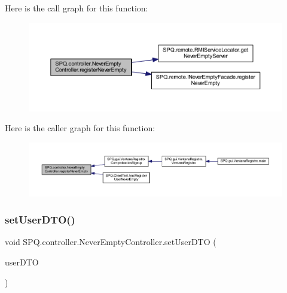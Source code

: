 Here is the call graph for this function\+:\nopagebreak
\begin{figure}[H]
\begin{center}
\leavevmode
\includegraphics[width=350pt]{class_s_p_q_1_1controller_1_1_never_empty_controller_ad02b010ba25f24bf105fe7b4605e3de1_cgraph}
\end{center}
\end{figure}
Here is the caller graph for this function\+:\nopagebreak
\begin{figure}[H]
\begin{center}
\leavevmode
\includegraphics[width=350pt]{class_s_p_q_1_1controller_1_1_never_empty_controller_ad02b010ba25f24bf105fe7b4605e3de1_icgraph}
\end{center}
\end{figure}
\mbox{\label{class_s_p_q_1_1controller_1_1_never_empty_controller_a847c0288b7c18327d81c092f8c234d01}} 
\subsubsection{\texorpdfstring{set\+User\+D\+T\+O()}{setUserDTO()}}
{\footnotesize\ttfamily void S\+P\+Q.\+controller.\+Never\+Empty\+Controller.\+set\+User\+D\+TO (\begin{DoxyParamCaption}\item[{\mbox{\hyperlink{class_s_p_q_1_1dto_1_1_user_d_t_o}{User\+D\+TO}}}]{user\+D\+TO }\end{DoxyParamCaption})}

